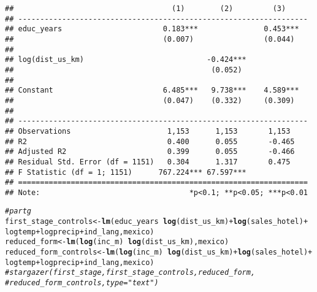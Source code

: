 \documentclass{article}\usepackage[]{graphicx}\usepackage[]{xcolor}
\makeatletter
\newcommand{\hlcom}[1]{\textcolor[rgb]{0.678,0.584,0.686}{\textit{#1}}}%
\newcommand{\hlopt}[1]{\textcolor[rgb]{0,0,0}{#1}}%
\newcommand{\hlstd}[1]{\textcolor[rgb]{0.345,0.345,0.345}{#1}}%
\newcommand{\hlkwb}[1]{\textcolor[rgb]{0.69,0.353,0.396}{#1}}%
\newcommand{\hlkwd}[1]{\textcolor[rgb]{0.737,0.353,0.396}{\textbf{#1}}}%
\newenvironment{kframe}{%
 \def\at@end@of@kframe{}%
 \ifinner\ifhmode%
  \def\at@end@of@kframe{\end{minipage}}%
  \begin{minipage}{\columnwidth}%
 \fi\fi%
 \def\FrameCommand##1{\hskip\@totalleftmargin \hskip-\fboxsep
 \colorbox{shadecolor}{##1}\hskip-\fboxsep
     \hskip-\linewidth \hskip-\@totalleftmargin \hskip\columnwidth}%
 \MakeFramed {\advance\hsize-\width
   \@totalleftmargin\z@ \linewidth\hsize
   \@setminipage}}%
 {\par\unskip\endMakeFramed%
 \at@end@of@kframe}
\newenvironment{knitrout}{}{} %
\makeatother
\begin{document}
\begin{knitrout}
\begin{kframe}
\begin{verbatim}
##                                    (1)        (2)         (3)     
## ------------------------------------------------------------------
## educ_years                       0.183***               0.453***  
##                                  (0.007)                (0.044)   
##                                                                   
## log(dist_us_km)                            -0.424***              
##                                             (0.052)               
##                                                                   
## Constant                         6.485***   9.738***    4.589***  
##                                  (0.047)    (0.332)     (0.309)   
##                                                                   
## ------------------------------------------------------------------
## Observations                      1,153      1,153       1,153    
## R2                                0.400      0.055       -0.465   
## Adjusted R2                       0.399      0.055       -0.466   
## Residual Std. Error (df = 1151)   0.304      1.317       0.475    
## F Statistic (df = 1; 1151)      767.224*** 67.597***              
## ==================================================================
## Note:                                  *p<0.1; **p<0.05; ***p<0.01
\end{verbatim}
\begin{alltt}
    \hlcom{# part g}
    \hlstd{first_stage_controls} \hlkwb{<-} \hlkwd{lm}\hlstd{(educ_years} \hlopt{~} \hlkwd{log}\hlstd{(dist_us_km)} \hlopt{+} \hlkwd{log}\hlstd{(sales_hotel)} \hlopt{+}
                                                \hlstd{logtemp} \hlopt{+} \hlstd{logprecip} \hlopt{+} \hlstd{ind_lang, mexico)}
    \hlstd{reduced_form} \hlkwb{<-} \hlkwd{lm}\hlstd{(}\hlkwd{log}\hlstd{(inc_m)} \hlopt{~} \hlkwd{log}\hlstd{(dist_us_km), mexico)}
    \hlstd{reduced_form_controls} \hlkwb{<-} \hlkwd{lm}\hlstd{(}\hlkwd{log}\hlstd{(inc_m)} \hlopt{~} \hlkwd{log}\hlstd{(dist_us_km)} \hlopt{+} \hlkwd{log}\hlstd{(sales_hotel)} \hlopt{+}
                                                \hlstd{logtemp} \hlopt{+} \hlstd{logprecip} \hlopt{+} \hlstd{ind_lang, mexico)}
    \hlcom{#stargazer(first_stage, first_stage_controls, reduced_form, }
    \hlcom{#            reduced_form_controls, type = "text")}
\end{alltt}
\end{kframe}
\end{knitrout}
\end{document}
